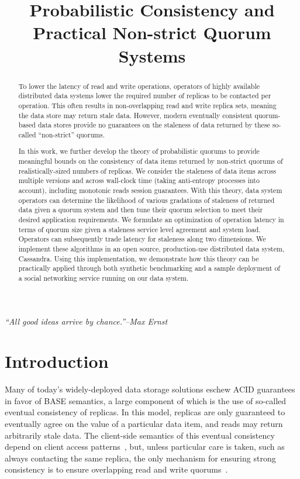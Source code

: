 \documentclass{vldb}
\title{Probabilistic Consistency and\\ Practical Non-strict Quorum Systems}
\begin{document}
\maketitle

\noindent\textit{``All good ideas arrive by chance.''--Max Ernst}

\begin{abstract}


To lower the latency of read and write operations, operators of highly
available distributed data systems lower the required number of replicas
to be contacted per operation. This often results in non-overlapping
read and write replica sets, meaning the data store may return stale
data. However, modern eventually consistent quorum-based data stores
provide no guarantees on the staleness of data returned by these
so-called “non-strict” quorums.

In this work, we further develop the theory of probabilistic quorums
to provide meaningful bounds on the consistency of data items returned
by non-strict quorums of realistically-sized numbers of replicas. We
consider the staleness of data items across multiple versions and
across wall-clock time (taking anti-entropy processes into account),
including monotonic reads session guarantees. With this theory, data
system operators can determine the likelihood of various gradations of
staleness of returned data given a quorum system and then tune their
quorum selection to meet their desired application requirements.  We
formulate an optimization of operation latency in terms of quorum size
given a staleness service level agreement and system load.  Operators
can subsequently trade latency for staleness along two dimensions. We
implement these algorithms in an open source, production-use
distributed data system, Cassandra. Using this implementation, we
demonstrate how this theory can be practically applied through both
synthetic benchmarking and a sample deployment of a social networking
service running on our data system.

\end{abstract}

\section{Introduction}


Many of today's widely-deployed data storage solutions eschew ACID
guarantees in favor of BASE semantics, a large component of which is
the use of so-called eventual consistency of replicas.  In this model,
replicas are only guaranteed to eventually agree on the value of a
particular data item, and reads may return arbitrarily stale data.
The client-side semantics of this eventual consistency depend on
client access patterns~\cite{vogels-defs}, but, unless particular care
is taken, such as always contacting the same replica, the only
mechanism for ensuring strong consistency is to ensure overlapping
read and write quorums~\cite{dynamo}.
\end{document}
